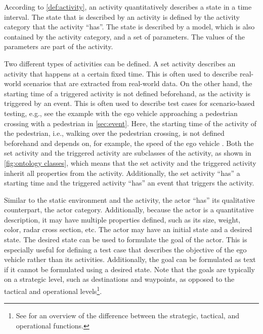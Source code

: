 According to \cref{def:activity}, an activity quantitatively describes a state in a time interval. The state that is described by an activity is defined by the activity category that the activity ``has''. The state is described by a model, which is also contained by the activity category, and a set of parameters. The values of the parameters are part of the activity. 

\cbstart
Two different types of activities can be defined. A set activity describes an activity that happens at a certain fixed time. This is often used to describe real-world scenarios that are extracted from real-world data. On the other hand, the starting time of a triggered activity is not defined beforehand, as the activity is triggered by an event. This is often used to describe test cases for scenario-based testing, e.g., see the example with the ego vehicle approaching a pedestrian crossing with a pedestrian in \cref{sec:event}. Here, the starting time of the activity of the pedestrian, i.e., walking over the pedestrian crossing, is not defined beforehand and depends on, for example, the speed of the ego vehicle \cite{seiniger2015test}. Both the set activity and the triggered activity are subclasses of the activity, as shown in \cref{fig:ontology classes}, which means that the set activity and the triggered activity inherit all properties from the activity. Additionally, the set activity ``has'' a starting time and the triggered activity ``has'' an event that triggers the activity.
\cbend

\cbstart
Similar to the static environment and the activity, the actor ``has'' its qualitative counterpart, the actor category. Additionally, because the actor is a quantitative description, it may have multiple properties defined, such as its size, weight, color, radar cross section, etc. The actor may have an initial state and a desired state. The desired state can be used to formulate the goal of the actor. This is especially useful for defining a test case that describes the objective of the ego vehicle rather than its activities. Additionally, the goal can be formulated as text if it cannot be formulated using a desired state.
Note that the goals are typically on a strategic level, such as destinations and waypoints, as opposed to the tactical and operational levels\footnote{\cbstart See \cite[p.~7, Figure 1]{sae2018j3016} for an overview of the difference between the strategic, tactical, and operational functions.\cbend}.
\cbend

